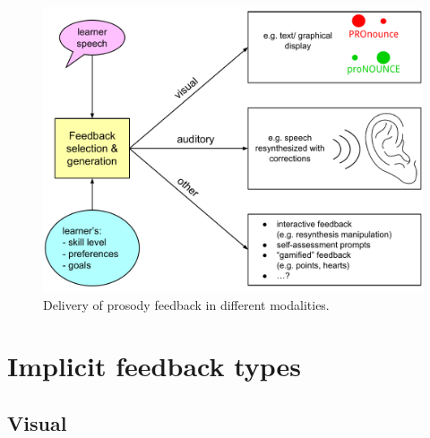 





	\begin{figure}[htb]
		\includegraphics[width=\textwidth]{img/feedback}
		\caption{Delivery of prosody feedback in different modalities. }
		\label{fig:feedback}
	\end{figure}

%




	\section{Implicit feedback types}
	
	
		\subsection{Visual }
		
